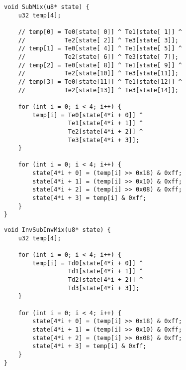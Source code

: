 \begin{lstlisting}[style=C, caption={SubMix},captionpos=t]
void SubMix(u8* state) {
	u32 temp[4];
	
	// temp[0] = Te0[state[ 0]] ^ Te1[state[ 1]] ^
	// 		  	 Te2[state[ 2]] ^ Te3[state[ 3]];
	// temp[1] = Te0[state[ 4]] ^ Te1[state[ 5]] ^
	//			 Te2[state[ 6]] ^ Te3[state[ 7]];
	// temp[2] = Te0[state[ 8]] ^ Te1[state[ 9]] ^
	// 			 Te2[state[10]] ^ Te3[state[11]];
	// temp[3] = Te0[state[11]] ^ Te1[state[12]] ^
	// 			 Te2[state[13]] ^ Te3[state[14]];
			  
	for (int i = 0; i < 4; i++) {
		temp[i] = Te0[state[4*i + 0]] ^
				  Te1[state[4*i + 1]] ^
				  Te2[state[4*i + 2]] ^
				  Te3[state[4*i + 3]];
	}

	for (int i = 0; i < 4; i++) {
		state[4*i + 0] = (temp[i] >> 0x18) & 0xff;
		state[4*i + 1] = (temp[i] >> 0x10) & 0xff;
		state[4*i + 2] = (temp[i] >> 0x08) & 0xff;
		state[4*i + 3] = temp[i] & 0xff;
	}
}
\end{lstlisting}
\vspace{12pt}
\begin{lstlisting}[style=C, caption={InvSubInvMix},captionpos=t]
void InvSubInvMix(u8* state) {
	u32 temp[4];
	
	for (int i = 0; i < 4; i++) {
		temp[i] = Td0[state[4*i + 0]] ^
				  Td1[state[4*i + 1]] ^
				  Td2[state[4*i + 2]] ^
				  Td3[state[4*i + 3]];
	}
	
	for (int i = 0; i < 4; i++) {
		state[4*i + 0] = (temp[i] >> 0x18) & 0xff;
		state[4*i + 1] = (temp[i] >> 0x10) & 0xff;
		state[4*i + 2] = (temp[i] >> 0x08) & 0xff;
		state[4*i + 3] = temp[i] & 0xff;
	}
}
\end{lstlisting}




